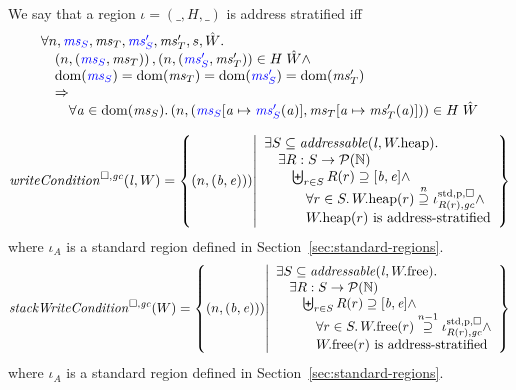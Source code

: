 \documentclass[a4paper]{article}
\begin{document}
\begin{definition}
  \label{def:address-stratified}
  We say that a region $\iota = (\_,H,\_)$ is address stratified iff
  \[
    \begin{array}{l}
      \forall n, \src{\ms_S},\ms_T,\src{\ms_S'},\ms_T',s,\hat{W}\ldotp \\
      \quad \npair{\stpair{\ms}{\ms}}, \npair{\stpair[.]{\ms_S'}{\ms_T'}} \in H \; \hat{W} \wedge \\
      \quad \dom(\src{\ms_S}) = \dom(\ms_T) = \dom(\src{\ms_S'}) = \dom(\ms_T') \\
      \quad \Rightarrow \\
      \qquad \forall \aaddr \in \dom(\ms_S) \ldotp \npair{(\src{\ms_S}\update{\aaddr}{\src{\ms_S'}(\aaddr)},\ms_T\update{\aaddr}{\ms_T'(\aaddr)})} \in H \; \hat{W}
    \end{array}
  \]
\end{definition}

\[
  \writeCond{\lin,W} = \left\{ \npair{(\baddr,\eaddr)}) \middle| 
    \begin{array}{l}
      \exists S \subseteq \addressable{\lin, \pwheap} \ldotp \\
      \quad \exists R : S \fun \powerset{\nats} \\
      \qquad \biguplus_{r\in S} R(r) \supseteq [\baddr,\eaddr] \wedge\\
      \qquad \quad \forall r \in S \ldotp \pwheap(r) \nsupeq \stdreg{R(r),\gc}{\pur} \wedge\\
      \qquad \quad \pwheap(r) \text{ is address-stratified}
    \end{array}
  \right\}
\]
where $\iota_A$ is a standard region defined in Section~\ref{sec:standard-regions}.
\[
  \stackWriteCond{W} = \left\{ \npair{(\baddr,\eaddr)}) \middle| 
    \begin{array}{l}
      \exists S \subseteq \addressable{\lin, \pwfree} \ldotp \\
      \quad \exists R : S \fun \powerset{\nats} \\
      \qquad \biguplus_{r\in S} R(r) \supseteq [\baddr,\eaddr] \wedge \\
      \qquad \quad \forall r \in S \ldotp \pwfree(r) \nsupeq[n-1] \stdreg{R(r),\gc}{\pur} \wedge\\
      \qquad \quad \pwfree(r) \text{ is address-stratified}
    \end{array}
  \right\}
\]
where $\iota_A$ is a standard region defined in Section~\ref{sec:standard-regions}.
\end{document}
